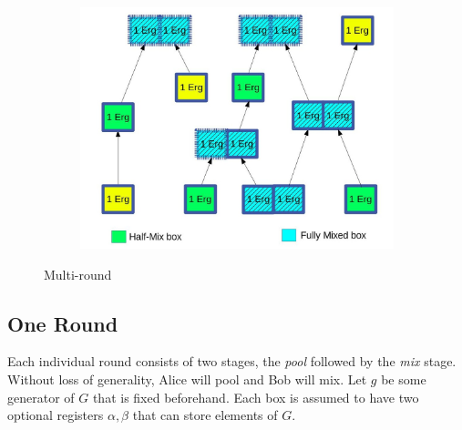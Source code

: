 \documentclass[runningheads]{llncs}
\begin{document}
\begin{figure}[h]
	\centering
	\begin{subfigure}{.6\textwidth}
		\centering
		\includegraphics[width=\linewidth]{ErgoMix}
	\end{subfigure}
	\caption{Multi-round \algname}
\label{fig:mixname}
\end{figure}


\subsection{One \algname Round}
Each individual \algname round consists of two stages, the {\em pool} followed by the {\em mix} stage. 
Without loss of generality, Alice will pool and Bob will mix. 
Let $g$ be some generator of $G$ that is fixed beforehand. Each box is assumed to have two optional registers $\alpha, \beta$ that can store elements of $G$.
\end{document}
